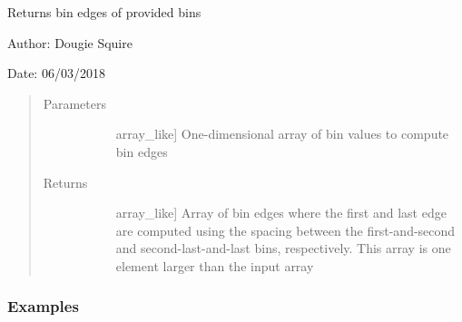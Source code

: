 \documentclass[letterpaper,10pt,english]{sphinxmanual}
\begin{document}

\begin{fulllineitems}
\label{\detokenize{utils_doc:utils.get_bin_edges}}
Returns bin edges of provided bins

\begin{DUlineblock}{0em}
\item[] Author: Dougie Squire
\item[] Date: 06/03/2018
\end{DUlineblock}
\begin{quote}\begin{description}
\item[{Parameters}] \leavevmode\begin{description}
\item[{}] \leavevmode{[}array\_like{]}
One-dimensional array of bin values to compute bin edges

\end{description}

\item[{Returns}] \leavevmode\begin{description}
\item[{}] \leavevmode{[}array\_like{]}
Array of bin edges where the first and last edge are computed using the spacing between                     the first-and-second and second-last-and-last bins, respectively. This array is one                    element larger than the input array

\end{description}

\end{description}\end{quote}
\subsubsection*{Examples}

\begin{sphinxVerbatim}[commandchars=\\\{\}]
  
  
\end{sphinxVerbatim}

\end{fulllineitems}
\end{document}
